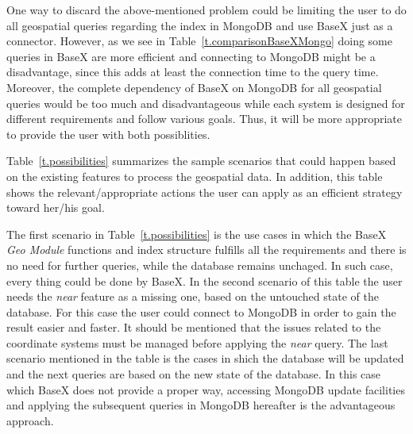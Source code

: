\documentclass[a4paper,12pt]{article}
\begin{document}
One way to discard the above-mentioned problem could be limiting the user to do all geospatial queries regarding the index in MongoDB and use BaseX just as a connector. 
However, as we see in Table~\ref{t.comparisonBaseXMongo} doing some queries in BaseX are more efficient and connecting to MongoDB might be a disadvantage, since this adds at least the connection time to the query time. Moreover, the complete dependency of BaseX on MongoDB for all geospatial queries would be too much and disadvantageous while each system is designed for different requirements and follow various goals. 
Thus, it will be more appropriate to provide the user with both possiblities.

Table~\ref{t.possibilities} summarizes the sample scenarios that could happen based on the existing features to process the geospatial data. In addition, this table shows the relevant/appropriate actions the user can apply as an efficient strategy toward her/his goal.


\begin{table}
\centering
{}
\caption{Possible scenarios and appropriate actions suggested to take}
\label{t.possibilities}
\end{table}

The first scenario in Table~\ref{t.possibilities} is the use cases in which the BaseX \textit{Geo Module} functions and index structure fulfills all the requirements and there is no need for further queries, while the database remains unchaged. In such case, every thing could be done by BaseX. In the second scenario of this table the user needs the \textit{near} feature as a missing one, based on the untouched state of the database. For this case the user could connect to MongoDB in order to gain the result easier and faster. It should be mentioned that the issues related to the coordinate systems must be managed before applying the \textit{near} query. The last scenario mentioned in the table is the cases in shich the database will be updated and the next queries are based on the new state of the database. In this case which BaseX does not provide a proper way, accessing MongoDB update facilities and applying the subsequent queries in MongoDB hereafter is the advantageous approach. 
\end{document}
